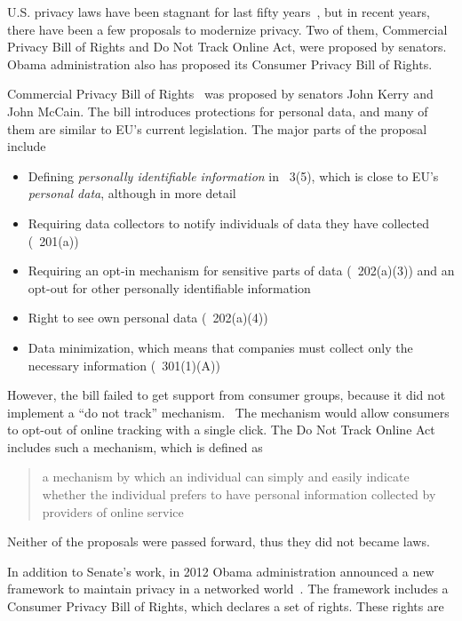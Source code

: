 \documentclass[12pt,a4paper,oneside,pdftex]{report}
\begin{document}
U.S. privacy laws have been stagnant for last fifty years~\cite{richards2010prosser}, but in recent years, there have been a few proposals to modernize privacy. Two of them, Commercial Privacy Bill of Rights and Do Not Track Online Act, were proposed by senators. Obama administration also has proposed its Consumer Privacy Bill of Rights.

Commercial Privacy Bill of Rights~\cite{com_pbr} was proposed by senators John Kerry and John McCain. The bill introduces protections for personal data, and  many of them are similar to EU's current legislation. The major parts of the proposal include

\begin{itemize}
    \item Defining \emph{personally identifiable information} in \textsection~3(5), which is close to EU's \emph{personal data}, although in more detail
    \item Requiring data collectors to notify individuals of data they have collected (\textsection~201(a))
    \item Requiring an opt-in mechanism for sensitive parts of data (\textsection~202(a)(3)) and an opt-out for other personally identifiable information
    \item Right to see own personal data (\textsection~202(a)(4))
    \item Data minimization, which means that companies must collect only the necessary information (\textsection~301(1)(A))
\end{itemize}

However, the bill failed to get support from consumer groups, because it did not implement a ``do not track'' mechanism.~\cite{jennings2012track} The mechanism would allow consumers to opt-out of online tracking with a single click. The Do Not Track Online Act~\cite{donottrack_act} includes such a mechanism, which is defined as

\begin{quote}
    a mechanism by which an individual can simply and easily indicate whether the individual prefers to have personal information collected by providers of online service
\end{quote}

Neither of the proposals were passed forward, thus they did not became laws.

In addition to Senate's work, in 2012 Obama administration announced a new framework to maintain privacy in a networked world~\cite{con_pbr}. The framework includes a Consumer Privacy Bill of Rights, which declares a set of rights. These rights are
\end{document}

